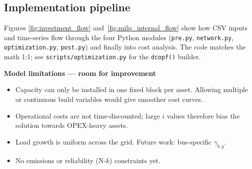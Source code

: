 \subsection{Implementation pipeline}
Figures \ref{fig:investment_flow} and~\ref{fig:milp_internal_flow}
show how CSV inputs and time-series flow through the four Python
modules (\texttt{pre.py}, \texttt{network.py}, \texttt{optimization.py},
\texttt{post.py}) and finally into cost analysis.  The code matches the
math 1:1; see \texttt{scripts/optimization.py} for the
\texttt{dcopf()} builder.

\medskip
\noindent\textbf{Model limitations — room for improvement}
\begin{itemize}
  \item Capacity can only be installed in one fixed block per asset.
        Allowing multiple or continuous build variables would give
        smoother cost curves.
  \item Operational costs are not time-discounted; large $i$ values
        therefore bias the solution towards OPEX-heavy assets.
  \item Load growth is uniform across the grid.  Future work:
        bus-specific $\gamma_{b,y}$.
  \item No emissions or reliability (N-$k$) constraints yet.
\end{itemize}






        
